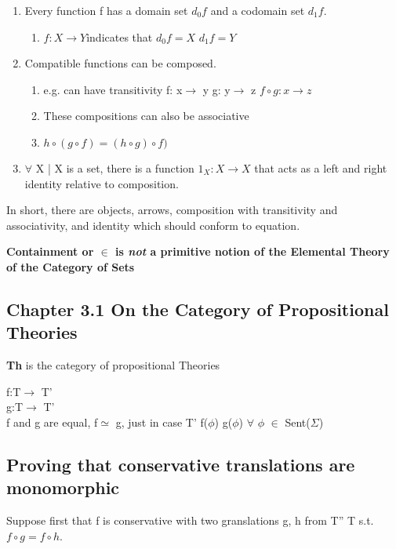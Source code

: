 \documentclass[11pt]{article}
\begin{document}
\begin{enumerate}
\item Every function f has a domain set \(d_0f\) and a codomain set \(d_1f\).
\begin{enumerate}
\item \(f:X\rightarrow Y\)indicates that \(d_0f=X\) \(d_1f=Y\)
\end{enumerate}
\item Compatible functions can be composed.
\begin{enumerate}
\item e.g. can have transitivity f: x\(\rightarrow\) y g: y\(\rightarrow\) z \(f \circ g: x\rightarrow z\)
\item These compositions can also be associative
\item \(h \circ (g \circ f) = (h \circ g) \circ f)\)
\end{enumerate}
\item \(\forall\) X | X is a set, there is a function \(1_X:X\rightarrow X\) that acts as a left and right identity relative to composition.
\end{enumerate}

In short, there are objects, arrows, composition with transitivity and associativity, and identity which should 
conform to equation.

\textbf{Containment or \(\in\) is \emph{not} a primitive notion of the Elemental Theory of the Category of Sets}

\subsection{Chapter 3.1 On the Category of Propositional Theories}
\label{sec:orge0d4fd9}
\textbf{Th} is the category of propositional Theories

f:T\(\rightarrow\) T'\\
g:T\(\rightarrow\) T'\\
f and g are equal, f\(\simeq\) g, just in case T' \vdash f(\(\phi\)) \iff g(\(\phi\)) \(\forall\) \(\phi\) \(\in\) 
Sent(\(\Sigma\))

\subsection{Proving that conservative translations are monomorphic}
\label{sec:orgb268540}
Suppose first that f is conservative with two granslations g, h from T'' \rightarro T s.t.
\(f\circ g = f\circ h\).
\end{document}
